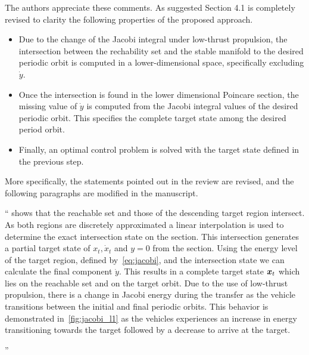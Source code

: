 \documentclass[11pt]{article}
\newenvironment{correction}{\begin{list}{}{\setlength{\leftmargin}{1cm}\setlength{\rightmargin}{1cm}}\vspace{\parsep}\item[]``}{''\end{list}}
\begin{document}
\begin{itemize}
        The authors appreciate these comments. 
        As suggested Section 4.1 is completely revised to clarity the following properties of the proposed approach.
        \begin{itemize}
            \item Due to the change of the Jacobi integral under low-thrust propulsion, the intersection between the rechability set and the stable manifold to the desired periodic orbit is computed in a lower-dimensional space, specifically excluding $\dot y$. 
            \item Once the intersection is found in the lower dimensional Poincare section, the missing value of $\dot y$ is computed from the Jacobi integral values of the desired periodic orbit. 
                This specifies the complete target state among the desired period orbit.
            \item Finally, an optimal control problem is solved with the target state defined in the previous step.
        \end{itemize}
        More specifically, the statements pointed out in the review are revised, and the following paragraphs are modified in the manuscript. 
        \begin{correction}
             shows that the reachable set and those of the descending target region intersect.
            As both regions are discretely approximated a linear interpolation is used to determine the exact intersection state on the \Poincare section.
            This intersection generates a partial target state of \( x_t, \dot{x}_t \) and \( y = 0 \) from the \Poincare section.
            Using the energy level of the target region, defined by~\cref{eq:jacobi}, and the intersection state we can calculate the final component \( \dot{y} \). 
            This results in a complete target state \( \bm{x}_t \) which lies on the reachable set and on the target orbit. 
            Due to the use of low-thrust propulsion, there is a change in Jacobi energy during the transfer as the vehicle transitions between the initial and final periodic orbits. 
            This behavior is demonstrated in~\cref{fig:jacobi_l1} as the vehicles experiences an increase in energy transitioning towards the target followed by a decrease to arrive at the target.


\end{correction}
\end{itemize}
\end{document}
